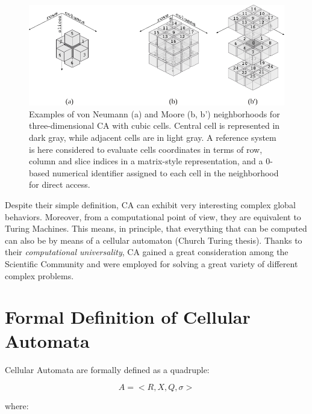 \begin{figure}
  \begin{center}
    \includegraphics[width=11.5cm]{./images/CellularAutomata/3Dneighborhoods.pdf}
    \caption{Examples of von Neumann (a) and Moore (b, b')
      neighborhoods for three-dimensional CA with cubic
      cells. Central cell is represented in dark gray, while adjacent
      cells are in light gray. A reference system is here considered
      to evaluate cells coordinates in terms of row, column and slice
      indices in a matrix-style representation, and a 0-based
      numerical identifier assigned to each cell in the neighborhood
      for direct access.}
    \label{fig:3Dneighborhood}
  \end{center}
\end{figure}

Despite their simple definition, CA can exhibit very interesting
complex global behaviors. Moreover, from a computational point of
view, they are equivalent to Turing Machines. This means, in
principle, that everything that can be computed can also be by means
of a cellular automaton (Church Turing thesis). Thanks to their
\emph{computational universality}, CA gained a great consideration
among the Scientific Community and were employed for solving a great
variety of different complex problems.

\section{Formal Definition of Cellular Automata}

Cellular Automata are formally defined as a quadruple:

$$A = <R,X,Q,\sigma>$$

\noindent where:

